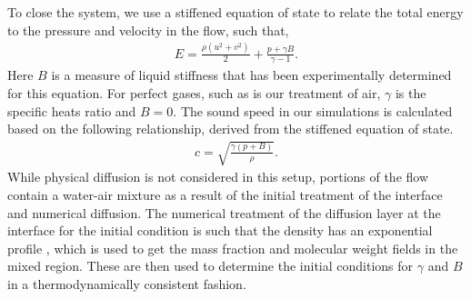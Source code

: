To close the system, we use a stiffened equation of state to
relate the total energy to the pressure and velocity in the flow, such
that,
% 
\begin{align} \label{eq:stiffened_eos}%
  E=\frac{\rho\left(u^2+v^2\right)}{2} + \frac{p+\gamma B}{\gamma-1}.
\end{align}
% 
Here $B$ is a measure of liquid stiffness that has been experimentally
determined for this equation. For perfect gases, such as is our
treatment of air, $\gamma$ is the specific heats ratio and $B=0$. The
sound speed in our simulations is calculated based on the following
relationship, derived from the stiffened equation of state.
% 
\begin{align}
  c = \sqrt{\frac{\gamma\left(p+B\right)}{\rho}}.
\end{align}
% 
While physical diffusion is not considered in this setup, portions of
the flow contain a water-air mixture as a result of the initial
treatment of the interface and numerical diffusion. The numerical
treatment of the diffusion layer at the interface for the initial
condition is such that the density has an exponential profile
\citep{Latini2007}, which is used to get the mass fraction and
molecular weight fields in the mixed region. These are then used to
determine the initial conditions for $\gamma$ and $B$ in a
thermodynamically consistent fashion.

